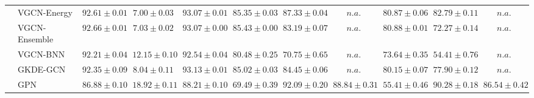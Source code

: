 \begin{table*}[!h]
{\begin{tabular}{ll|cc|cccc|ccc}
        & VGCN-Energy & ${92.61\scriptscriptstyle \pm 0.01}$ & ${7.00\scriptscriptstyle \pm 0.03}$ & ${93.07\scriptscriptstyle \pm 0.01}$ & ${85.35\scriptscriptstyle \pm 0.03}$ & ${87.33\scriptscriptstyle \pm 0.04}$ & $n.a.$ & ${80.87\scriptscriptstyle \pm 0.06}$ & ${82.79\scriptscriptstyle \pm 0.11}$ & $n.a.$\\
        & VGCN-Ensemble & ${92.66\scriptscriptstyle \pm 0.01}$ & ${7.03\scriptscriptstyle \pm 0.02}$ & ${93.07\scriptscriptstyle \pm 0.00}$ & ${85.43\scriptscriptstyle \pm 0.00}$ & ${83.19\scriptscriptstyle \pm 0.07}$ & $n.a.$ & ${{80.88}\scriptscriptstyle \pm 0.01}$ & ${72.27\scriptscriptstyle \pm 0.14}$ & $n.a.$\\
        & VGCN-BNN & ${92.21\scriptscriptstyle \pm 0.04}$ & ${12.15\scriptscriptstyle \pm 0.10}$ & ${92.54\scriptscriptstyle \pm 0.04}$ & ${80.48\scriptscriptstyle \pm 0.25}$ & ${70.75\scriptscriptstyle \pm 0.65}$ & $n.a.$ & ${73.64\scriptscriptstyle \pm 0.35}$ & ${54.41\scriptscriptstyle \pm 0.76}$ & $n.a.$\\
        & GKDE-GCN & ${92.35\scriptscriptstyle \pm 0.09}$ & ${8.04\scriptscriptstyle \pm 0.11}$ & ${93.13\scriptscriptstyle \pm 0.01}$ & ${85.02\scriptscriptstyle \pm 0.03}$ & ${84.45\scriptscriptstyle \pm 0.06}$ & $n.a.$ & ${80.15\scriptscriptstyle \pm 0.07}$ & ${77.90\scriptscriptstyle \pm 0.12}$ & $n.a.$\\
        & GPN & ${86.88\scriptscriptstyle \pm 0.10}$ & ${18.92\scriptscriptstyle \pm 0.11}$ & ${88.21\scriptscriptstyle \pm 0.10}$ & ${69.49\scriptscriptstyle \pm 0.39}$ & ${\mathbf{92.09}\scriptscriptstyle \pm 0.20}$ & ${{88.84}\scriptscriptstyle \pm 0.31}$ & ${55.41\scriptscriptstyle \pm 0.46}$ & ${\mathbf{90.28}\scriptscriptstyle \pm 0.18}$ & ${{86.54}\scriptscriptstyle \pm 0.42}$\\


\end{tabular}}
\end{table*}
